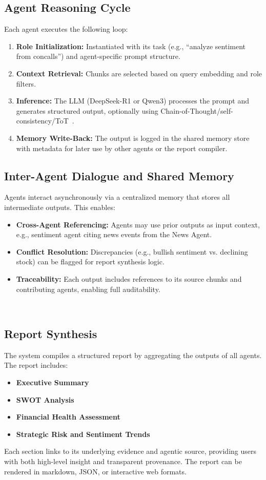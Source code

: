 \documentclass[11pt]{article}
\begin{document}
\subsection*{Agent Reasoning Cycle}
Each agent executes the following loop:
\begin{enumerate}
    \item \textbf{Role Initialization:} Instantiated with its task (e.g., ``analyze sentiment from concalls'') and agent-specific prompt structure.
    \item \textbf{Context Retrieval:} Chunks are selected based on query embedding and role filters.
    \item \textbf{Inference:} The LLM (DeepSeek-R1 or Qwen3) processes the prompt and generates structured output, optionally using Chain-of-Thought/self-consistency/ToT~\citep{wei2022chain,wang2022selfconsistency,yao2023tree}.
    \item \textbf{Memory Write-Back:} The output is logged in the shared memory store with metadata for later use by other agents or the report compiler.
\end{enumerate}

\subsection*{Inter-Agent Dialogue and Shared Memory}
Agents interact asynchronously via a centralized memory that stores all intermediate outputs. This enables:
\begin{itemize}
    \item \textbf{Cross-Agent Referencing:} Agents may use prior outputs as input context, e.g., sentiment agent citing news events from the News Agent.
    \item \textbf{Conflict Resolution:} Discrepancies (e.g., bullish sentiment vs. declining stock) can be flagged for report synthesis logic.
    \item \textbf{Traceability:} Each output includes references to its source chunks and contributing agents, enabling full auditability.
\end{itemize}~\citep{wu2023autogen,li2023camel,yao2023react}

\subsection*{Report Synthesis}
The system compiles a structured report by aggregating the outputs of all agents. The report includes:
\begin{itemize}
    \item \textbf{Executive Summary}
    \item \textbf{SWOT Analysis}
    \item \textbf{Financial Health Assessment}
    \item \textbf{Strategic Risk and Sentiment Trends}
\end{itemize}
Each section links to its underlying evidence and agentic source, providing users with both high-level insight and transparent provenance. The report can be rendered in markdown, JSON, or interactive web formats.
\end{document}
